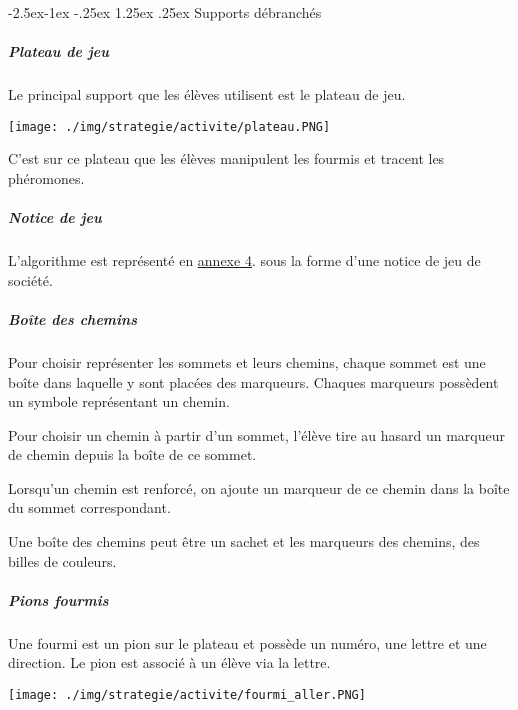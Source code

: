 \documentclass[
12pt,
french,
]{article}
\makeatletter
\let\origfigure\figure
\let\endorigfigure\endfigure
\renewenvironment{figure}[1][2] {
  \expandafter\origfigure\expandafter[H]
} {
  \endorigfigure
}
\renewcommand\paragraph{\@startsection{paragraph}{4}{\z@}%
        {-2.5ex\@plus -1ex \@minus -.25ex}%
        {1.25ex \@plus .25ex}%
        {\normalfont\normalsize\bfseries}}
\makeatother
\begin{document}
\hypertarget{supports-duxe9branchuxe9s}{%
\paragraph{Supports débranchés}\label{supports-duxe9branchuxe9s}}

\hypertarget{plateau-de-jeu}{%
\subparagraph{Plateau de jeu}\label{plateau-de-jeu}}

Le principal support que les élèves utilisent est le plateau de jeu.

\begin{figure}
\centering
\texttt{[image: ./img/strategie/activite/plateau.PNG]}
\caption{Plateau de jeu}
\end{figure}

C'est sur ce plateau que les élèves manipulent les fourmis et tracent
les phéromones.

\hypertarget{notice-de-jeu}{%
\subparagraph{Notice de jeu}\label{notice-de-jeu}}

L'algorithme est représenté en \hyperref[sec:annexe4]{annexe 4}. sous la
forme d'une notice de jeu de société.

\hypertarget{bouxeete-des-chemins}{%
\subparagraph{Boîte des chemins}\label{bouxeete-des-chemins}}

Pour choisir représenter les sommets et leurs chemins, chaque sommet est
une boîte dans laquelle y sont placées des marqueurs. Chaques marqueurs
possèdent un symbole représentant un chemin.

Pour choisir un chemin à partir d'un sommet, l'élève tire au hasard un
marqueur de chemin depuis la boîte de ce sommet.

Lorsqu'un chemin est renforcé, on ajoute un marqueur de ce chemin dans
la boîte du sommet correspondant.

Une boîte des chemins peut être un sachet et les marqueurs des chemins,
des billes de couleurs.

\hypertarget{pions-fourmis}{%
\subparagraph{Pions fourmis}\label{pions-fourmis}}

Une fourmi est un pion sur le plateau et possède un numéro, une lettre
et une direction. Le pion est associé à un élève via la lettre.

\begin{figure}
\centering
\texttt{[image: ./img/strategie/activite/fourmi\_aller.PNG]}
\caption{Fourmi n°1 de l'élève A en mode aller}
\end{figure}
\end{document}
